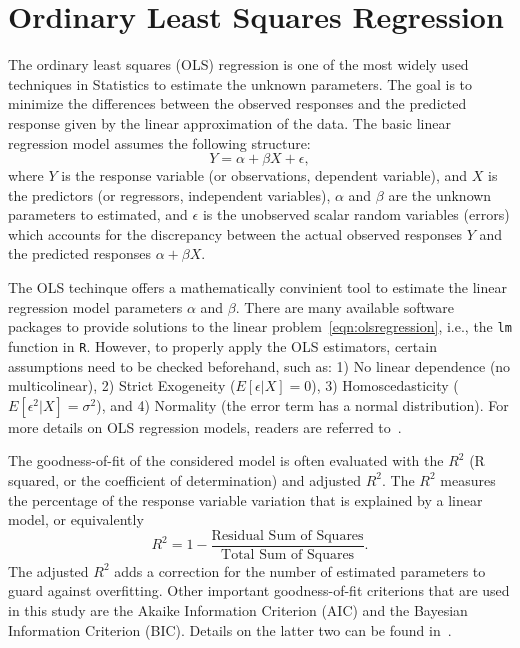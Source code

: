 \documentclass [11pt, proquest] {uwthesis}[2015/03/03]
\begin{document}
\section{Ordinary Least Squares Regression}
The ordinary least squares (OLS) regression is one of the most widely used techniques in Statistics to estimate the unknown parameters. The goal is to minimize the differences between the observed responses and the predicted response given by the linear approximation of the data. The basic linear regression model assumes the following structure:
\begin{equation}
Y = \alpha + \beta X + \epsilon, \label{eqn:olsregression}
\end{equation}
where $Y$ is the response variable (or observations, dependent variable), and $X$ is the predictors (or regressors, independent variables), $\alpha$ and $\beta$ are the unknown parameters to estimated, and $\epsilon$ is the unobserved scalar random variables (errors) which accounts for the discrepancy between the actual observed responses $Y$ and the predicted responses $\alpha + \beta X$.  

The OLS techinque offers a mathematically convinient tool to estimate the linear regression model parameters $\alpha$ and $\beta$. There are many available software packages to provide solutions to the linear problem~\eqref{eqn:olsregression}, i.e., the \texttt{lm} function in \texttt{R}. However, to properly apply the OLS estimators, certain assumptions need to be checked beforehand, such as: 1) No linear dependence (no multicolinear), 2) Strict Exogeneity ($E[\epsilon|X]=0$), 3) Homoscedasticity ($E[\epsilon^2|X]=\sigma^2$), and 4) Normality (the error term has a normal distribution). For more details on OLS regression models, readers are referred to~\cite{}.

The goodness-of-fit of the considered model is often evaluated with the $R^2$ (R squared, or the coefficient of determination) and adjusted $R^2$. The $R^2$ measures the percentage of the response variable variation that is explained by a linear model, or equivalently
\begin{equation}
R^2 = 1- \frac{\text{Residual Sum of Squares}}{\text{Total Sum of Squares}}.\label{eqn:R2}
\end{equation}
The adjusted $R^2$ adds a correction for the number of estimated parameters to guard against overfitting. Other important goodness-of-fit criterions that are used in this study are the Akaike Information Criterion (AIC) and the Bayesian Information Criterion (BIC). Details on the latter two can be found in~\cite{}.
\end{document}
